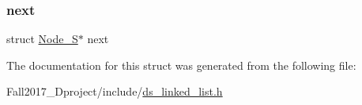 \mbox{\label{struct_node___s_aa06ac35a70bd6374c9178f1bce8d5368}} 
\subsubsection{\texorpdfstring{next}{next}}
{\footnotesize\ttfamily struct \hyperlink{struct_node___s}{Node\+\_\+S}$\ast$ next}



The documentation for this struct was generated from the following file\+:\begin{DoxyCompactItemize}
\item 
Fall2017\+\_\+Dproject/include/\hyperlink{ds__linked__list_8h}{ds\+\_\+linked\+\_\+list.\+h}\end{DoxyCompactItemize}
